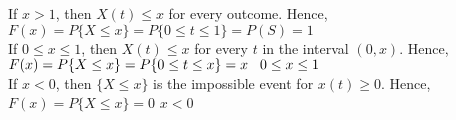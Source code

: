\documentclass{beamer}
\begin{document}
\begin{frame}
\hspace*{10mm}If $x>1$, then $X(t)\le x$ for every outcome. Hence,\\
\hspace*{20mm}$F(x) = P\{X\le x\} = P\{0\le t \le 1\}= P(S)=1$\\
\vspace*{10mm}   
\hspace*{10mm}If $0 \le x \le 1$, then $X(t)\le x$ for every $t$ in the interval $(0,x)$. Hence,\\
\hspace*{20mm}$F(x) = P\{X\le x\} = P\{0\le t \le x\}=x \hspace*{3mm} 0\le x \le 1 $\\     
\vspace*{10mm}    
\hspace*{10mm}If $x<0$, then $\{X \le x\}$ is the impossible event for $x(t) \ge 0$. Hence,\\
\hspace*{20mm}$F(x) = P\{X\le x\} = 0$ \hspace*{3mm} $x<0$\\              
\end{frame}
\end{document}
